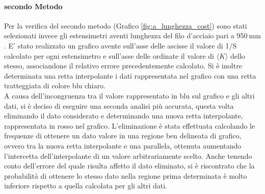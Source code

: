 \documentclass[a4paper,11pt,oneside]{article}
\begin{document}
\paragraph{secondo Metodo}
Per la verifica del secondo metodo (Grafico \ref{fig:a_lunghezza_cost}) sono stati selezionati invece gli estensimetri aventi lunghezza del filo d'acciaio pari a $\SI{950}{\milli\meter}$. E' stato realizzato un grafico avente sull'asse delle ascisse il valore di 1/S  calcolato per ogni estensimetro e sull'asse delle ordinate il valore di $\langle K \rangle$ dello stesso, associandone il relativo errore precedentemente calcolato. Si è inoltre determinata una retta interpolante i dati rappresentata nel grafico con una retta tratteggiata di colore blu chiaro.\\
A causa dell'incongruenza tra il valore rappresentato in blu sul grafico e gli altri dati, si è deciso di eseguire una seconda analisi più accurata, questa volta eliminando il dato considerato e determinando una nuova retta interpolante, rappresentata in rosso nel grafico. L'eliminazione è stata effettuata calcolando le frequenze di ottenere un dato valore in una regione ben delineata di grafico, ovvero tra la nuova retta interpolante e una parallela, ottenuta aumentando l'intercetta dell'interpolante di un valore arbitrariamente scelto. Anche tenendo conto dell'errore del quale risulta affetto il dato eliminato, si è riscontrato che la probabilità di ottenere lo stesso dato nella regione prima determinata è molto inferiore rispetto a quella calcolata per gli altri dati.
\end{document}
